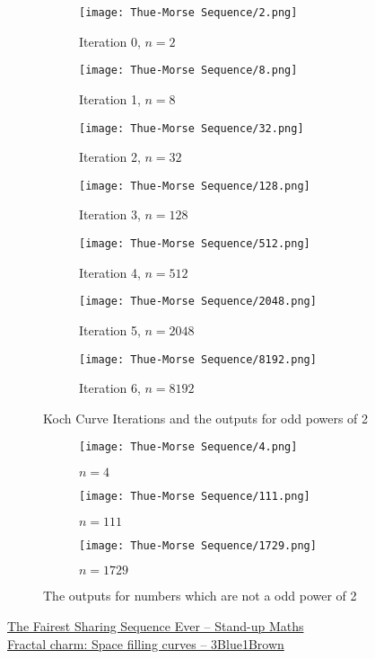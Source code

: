 \documentclass[../../Problems]{subfiles}
\begin{document}
\begin{figure}[H]
	\centering
	\begin{subfigure}{0.3\linewidth}
		\texttt{[image: Thue-Morse Sequence/2.png]}
		\caption{Iteration 0, $n=2$}
	\end{subfigure}
	\begin{subfigure}{0.3\linewidth}
		\texttt{[image: Thue-Morse Sequence/8.png]}
		\caption{Iteration 1, $n=8$}
	\end{subfigure}
	\begin{subfigure}{0.3\linewidth}
		\texttt{[image: Thue-Morse Sequence/32.png]}
		\caption{Iteration 2, $n=32$}
	\end{subfigure}
	\begin{subfigure}{0.3\linewidth}
		\texttt{[image: Thue-Morse Sequence/128.png]}
		\caption{Iteration 3, $n=128$}
	\end{subfigure}
	\begin{subfigure}{0.3\linewidth}
		\texttt{[image: Thue-Morse Sequence/512.png]}
		\caption{Iteration 4, $n=512$}
	\end{subfigure}
	\begin{subfigure}{0.3\linewidth}
		\texttt{[image: Thue-Morse Sequence/2048.png]}
		\caption{Iteration 5, $n=2048$}
	\end{subfigure}
	\begin{subfigure}{0.3\linewidth}
		\texttt{[image: Thue-Morse Sequence/8192.png]}
		\caption{Iteration 6, $n=8192$}
	\end{subfigure}
	\caption{Koch Curve Iterations and the outputs for odd powers of 2}
\end{figure}
\begin{figure}[H]
	\centering
	\begin{subfigure}{0.3\linewidth}
		\texttt{[image: Thue-Morse Sequence/4.png]}
		\caption{$n=4$}
	\end{subfigure}
	\begin{subfigure}{0.3\linewidth}
		\texttt{[image: Thue-Morse Sequence/111.png]}
		\caption{$n=111$}
	\end{subfigure}
	\begin{subfigure}{0.3\linewidth}
		\texttt{[image: Thue-Morse Sequence/1729.png]}
		\caption{$n=1729$}
	\end{subfigure}
	\caption{The outputs for numbers which are not a odd power of 2}
\end{figure}
\begin{funvideo}
	\href{https://youtu.be/prh72BLNjIk}{The Fairest Sharing Sequence Ever -- Stand-up Maths}\\
	\href{https://youtu.be/RU0wScIj36o}{Fractal charm: Space filling curves -- 3Blue1Brown}
\end{funvideo}
\recalctypearea
\end{document}
